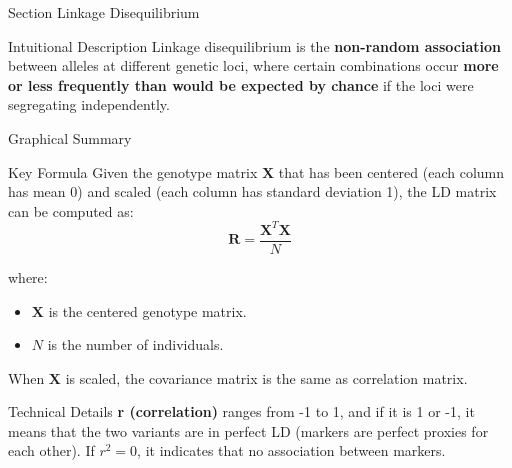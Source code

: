 
\begin{frame}{Section}
\centering
\Huge{Linkage Disequilibrium}
\end{frame}


\begin{frame}{Intuitional Description}
Linkage disequilibrium is the \textbf{non-random association} between alleles at different genetic loci, where certain combinations occur \textbf{more or less frequently than would be expected by chance} if the loci were segregating independently.
\end{frame}

\begin{frame}{Graphical Summary}

\end{frame}


\begin{frame}{Key Formula}
Given the genotype matrix $\mathbf{X}$ that has been centered (each column has mean 0) and scaled (each column has standard deviation 1), the LD matrix can be computed as:
$$
\mathbf{R} = \frac{\mathbf{X}^T \mathbf{X}}{N}
$$

where:

\begin{itemize}
\item $\mathbf{X}$ is the centered genotype matrix.
\item $N$ is the number of individuals.
\end{itemize}

When $\mathbf{X}$ is scaled, the covariance matrix is the same as correlation matrix.
\end{frame}


\begin{frame}{Technical Details}
\textbf{r (correlation)} ranges from -1 to 1, and if it is 1 or -1, it means that the two variants are in perfect LD (markers are perfect proxies for each other). If $r^2=0$, it indicates that no association between markers.

\end{frame}

